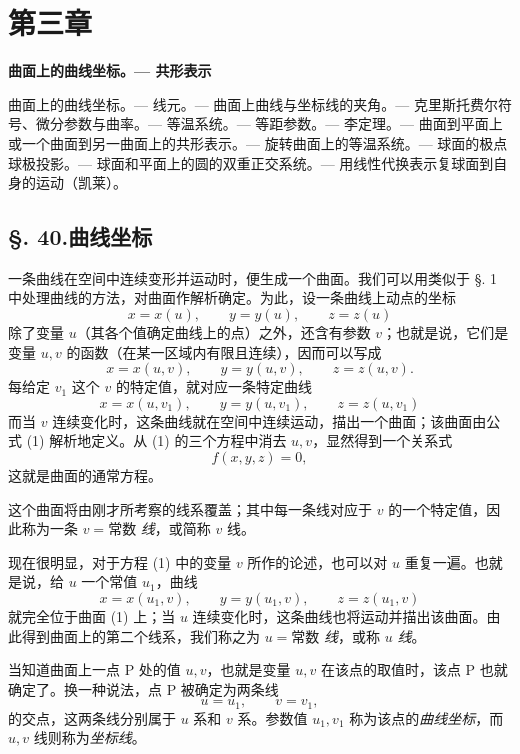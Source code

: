 \section*{第三章}
\begin{center}
{\Large\bfseries 曲面上的曲线坐标。--- 共形表示}
\end{center}

\begin{center}\footnotesize
曲面上的曲线坐标。--- 线元。--- 曲面上曲线与坐标线的夹角。--- 克里斯托费尔符号、微分参数与曲率。--- 等温系统。--- 等距参数。--- 李定理。--- 曲面到平面上或一个曲面到另一曲面上的共形表示。--- 旋转曲面上的等温系统。--- 球面的极点球极投影。--- 球面和平面上的圆的双重正交系统。--- 用线性代换表示复球面到自身的运动（凯莱）。
\end{center}

\subsection*{\S. 40.\quad 曲线坐标}

一条曲线在空间中连续变形并运动时，便生成一个曲面。我们可以用类似于 \S. 1 中处理曲线的方法，对曲面作解析确定。为此，设一条曲线上动点的坐标
\[
 x=x(u),\qquad y=y(u),\qquad z=z(u)
\]
除了变量 \(u\)（其各个值确定曲线上的点）之外，还含有参数 \(v\)；也就是说，它们是变量 \(u,v\) 的函数（在某一区域内有限且连续），因而可以写成
\begin{equation}\tag{1}
 x=x(u,v),\qquad y=y(u,v),\qquad z=z(u,v).
\end{equation}
每给定 \(v_1\) 这个 \(v\) 的特定值，就对应一条特定曲线
\[
 x=x(u,v_1),\qquad y=y(u,v_1),\qquad z=z(u,v_1)
\]
而当 \(v\) 连续变化时，这条曲线就在空间中连续运动，描出一个曲面；该曲面由公式 (1) 解析地定义。从 (1) 的三个方程中消去 \(u,v\)，显然得到一个关系式
\[
 f(x,y,z)=0,
\]
这就是曲面的通常方程。

这个曲面将由刚才所考察的线系覆盖；其中每一条线对应于 \(v\) 的一个特定值，因此称为一条 \(v=\mathrm{常数}\) \emph{线}，或简称 \(v\) 线。

现在很明显，对于方程 (1) 中的变量 \(v\) 所作的论述，也可以对 \(u\) 重复一遍。也就是说，给 \(u\) 一个常值 \(u_1\)，曲线
\[
 x=x(u_1,v),\qquad y=y(u_1,v),\qquad z=z(u_1,v)
\]
就完全位于曲面 (1) 上；当 \(u\) 连续变化时，这条曲线也将运动并描出该曲面。由此得到曲面上的第二个线系，我们称之为 \(u=\mathrm{常数}\) \emph{线}，或称 \(u\) \emph{线}。

当知道曲面上一点 P 处的值 \(u,v\)，也就是变量 \(u,v\) 在该点的取值时，该点 P 也就确定了。换一种说法，点 P 被确定为两条线
\[
 u=u_1,\qquad v=v_1,
\]
的交点，这两条线分别属于 \(u\) 系和 \(v\) 系。参数值 \(u_1,v_1\) 称为该点的\emph{曲线坐标}，而 \(u,v\) 线则称为\emph{坐标线}。

